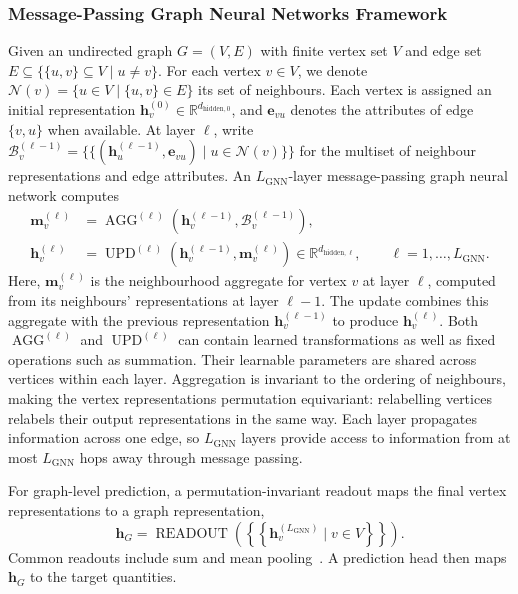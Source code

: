 \subsubsection{Message-Passing Graph Neural Networks Framework}
Given an undirected graph $G=(V,E)$ with finite vertex set $V$ and edge set $E\subseteq\{\{u,v\}\subseteq V\mid u\neq v\}$. For each vertex $v\in V$, we denote $\mathcal N(v)=\{u\in V\mid\{u,v\}\in E\}$ its set of neighbours. Each vertex is assigned an initial representation $\mathbf{h}_v^{(0)}\in\mathbb{R}^{d_{\mathrm{hidden},0}}$, and $\mathbf{e}_{vu}$ denotes the attributes of edge $\{v,u\}$ when available. At layer $\ell$, write $\mathcal B_v^{(\ell-1)}=\{\!\{(\mathbf{h}_u^{(\ell-1)},\mathbf{e}_{vu})\mid u\in \mathcal N(v)\}\!\}$ for the multiset of neighbour representations and edge attributes. An $L_{\mathrm{GNN}}$-layer message-passing graph neural network computes
\begin{equation}
\label{eq:ch07:message-passing}
\begin{aligned}
    \mathbf{m}_v^{(\ell)} &= \operatorname{AGG}^{(\ell)}\!\left(
        \mathbf{h}_v^{(\ell-1)},\mathcal B_v^{(\ell-1)}\right), \\
    \mathbf{h}_v^{(\ell)} &= \operatorname{UPD}^{(\ell)}\!\left(\mathbf{h}_v^{(\ell-1)},\mathbf{m}_v^{(\ell)}\right)
        \in\mathbb{R}^{d_{\mathrm{hidden},\ell}}, \qquad \ell=1,\ldots,L_{\mathrm{GNN}}.
\end{aligned}
\end{equation}
Here, $\mathbf{m}_v^{(\ell)}$ is the neighbourhood aggregate for vertex $v$ at layer $\ell$, computed from its neighbours' representations at layer $\ell-1$. The update combines this aggregate with the previous representation $\mathbf{h}_v^{(\ell-1)}$ to produce $\mathbf{h}_v^{(\ell)}$. Both $\operatorname{AGG}^{(\ell)}$ and $\operatorname{UPD}^{(\ell)}$ can contain learned transformations as well as fixed operations such as summation. Their learnable parameters are shared across vertices within each layer. Aggregation is invariant to the ordering of neighbours, making the vertex representations permutation equivariant: relabelling vertices relabels their output representations in the same way. Each layer propagates information across one edge, so $L_{\mathrm{GNN}}$ layers provide access to information from at most $L_{\mathrm{GNN}}$ hops away through message passing.

For graph-level prediction, a permutation-invariant readout maps the final vertex representations to a graph representation,
\begin{equation}
\label{eq:ch07:graph-readout}
    \mathbf{h}_G=\operatorname{READOUT}\!\left(
        \left\{\!\left\{\mathbf{h}_v^{(L_{\mathrm{GNN}})}\mid v\in V\right\}\!\right\}
        \right).
\end{equation}
Common readouts include sum and mean pooling~\citep{GilEtAl17,XuEtAl19}. A prediction head then maps $\mathbf{h}_G$ to the target quantities.

